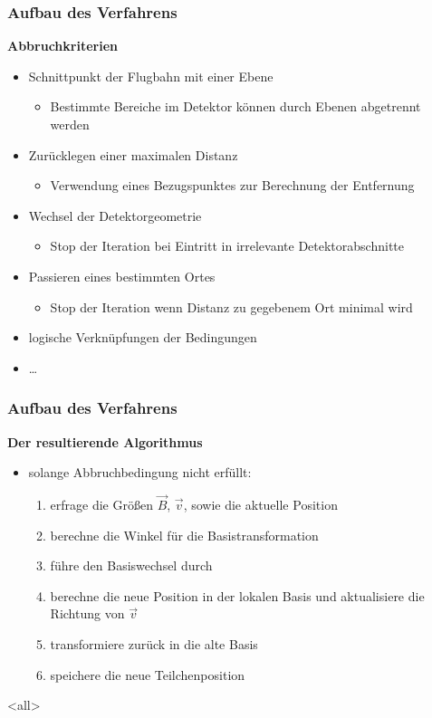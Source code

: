\begin{frame}
  \frametitle{Aufbau des Verfahrens}
  \textbf{Abbruchkriterien}
  \begin{itemize}
    \item Schnittpunkt der Flugbahn mit einer Ebene
      \begin{itemize}
        \item Bestimmte Bereiche im Detektor k\"onnen durch Ebenen abgetrennt werden
      \end{itemize}
    \item Zur\"ucklegen einer maximalen Distanz
      \begin{itemize}
        \item Verwendung eines Bezugspunktes zur Berechnung der Entfernung
      \end{itemize}
    \item Wechsel der Detektorgeometrie
      \begin{itemize}
        \item Stop der Iteration bei Eintritt in irrelevante Detektorabschnitte
      \end{itemize}
    \item Passieren eines bestimmten Ortes
      \begin{itemize}
        \item Stop der Iteration wenn Distanz zu gegebenem Ort minimal wird
      \end{itemize}
    \item logische Verkn\"upfungen der Bedingungen
    \item \ldots
  \end{itemize}
\end{frame}

\begin{frame}
  \frametitle{Aufbau des Verfahrens}
  \textbf{Der resultierende Algorithmus}\\
  \begin{itemize}
  \item solange Abbruchbedingung nicht erf\"ullt:
    \begin{enumerate}
    \item erfrage die Gr\"o{\ss}en \(\vec{B}\), \(\vec{v}\), sowie die aktuelle Position
    \item berechne die Winkel f\"ur die Basistransformation
    \item f\"uhre den Basiswechsel durch
    \item berechne die neue Position in der lokalen Basis und aktualisiere die Richtung von \(\vec{v}\)
    \item transformiere zur\"uck in die alte Basis
    \item speichere die neue Teilchenposition
    \end{enumerate}
  \end{itemize}
\end{frame}

\mode<all>
